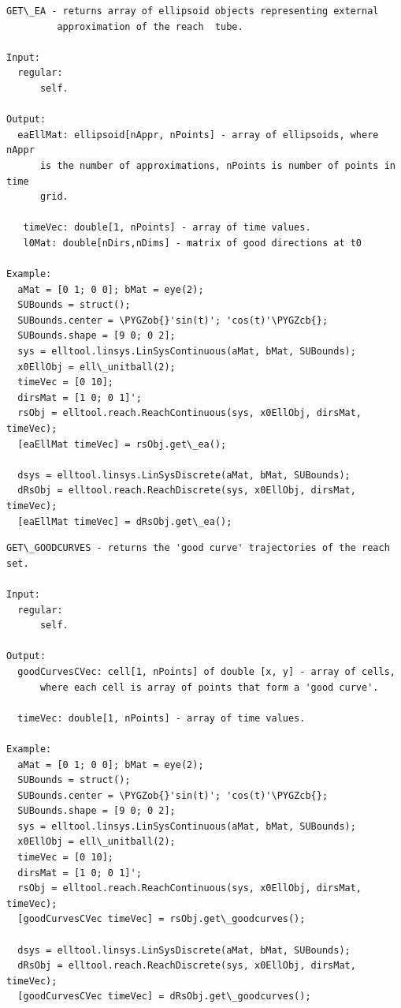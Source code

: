 \documentclass[letterpaper,10pt,english]{sphinxmanual}
\def\PYGZob{\char`\{}
\def\PYGZcb{\char`\}}
\begin{document}
\begin{Verbatim}[commandchars=\\\{\}]
GET\_EA - returns array of ellipsoid objects representing external
         approximation of the reach  tube.

Input:
  regular:
      self.

Output:
  eaEllMat: ellipsoid[nAppr, nPoints] - array of ellipsoids, where nAppr
      is the number of approximations, nPoints is number of points in time
      grid.

   timeVec: double[1, nPoints] - array of time values.
   l0Mat: double[nDirs,nDims] - matrix of good directions at t0

Example:
  aMat = [0 1; 0 0]; bMat = eye(2);
  SUBounds = struct();
  SUBounds.center = \PYGZob{}'sin(t)'; 'cos(t)'\PYGZcb{};
  SUBounds.shape = [9 0; 0 2];
  sys = elltool.linsys.LinSysContinuous(aMat, bMat, SUBounds);
  x0EllObj = ell\_unitball(2);
  timeVec = [0 10];
  dirsMat = [1 0; 0 1]';
  rsObj = elltool.reach.ReachContinuous(sys, x0EllObj, dirsMat, timeVec);
  [eaEllMat timeVec] = rsObj.get\_ea();

  dsys = elltool.linsys.LinSysDiscrete(aMat, bMat, SUBounds);
  dRsObj = elltool.reach.ReachDiscrete(sys, x0EllObj, dirsMat, timeVec);
  [eaEllMat timeVec] = dRsObj.get\_ea();
\end{Verbatim}

\begin{Verbatim}[commandchars=\\\{\}]
GET\_GOODCURVES - returns the 'good curve' trajectories of the reach set.

Input:
  regular:
      self.

Output:
  goodCurvesCVec: cell[1, nPoints] of double [x, y] - array of cells,
      where each cell is array of points that form a 'good curve'.

  timeVec: double[1, nPoints] - array of time values.

Example:
  aMat = [0 1; 0 0]; bMat = eye(2);
  SUBounds = struct();
  SUBounds.center = \PYGZob{}'sin(t)'; 'cos(t)'\PYGZcb{};
  SUBounds.shape = [9 0; 0 2];
  sys = elltool.linsys.LinSysContinuous(aMat, bMat, SUBounds);
  x0EllObj = ell\_unitball(2);
  timeVec = [0 10];
  dirsMat = [1 0; 0 1]';
  rsObj = elltool.reach.ReachContinuous(sys, x0EllObj, dirsMat, timeVec);
  [goodCurvesCVec timeVec] = rsObj.get\_goodcurves();

  dsys = elltool.linsys.LinSysDiscrete(aMat, bMat, SUBounds);
  dRsObj = elltool.reach.ReachDiscrete(sys, x0EllObj, dirsMat, timeVec);
  [goodCurvesCVec timeVec] = dRsObj.get\_goodcurves();
\end{Verbatim}
\end{document}
